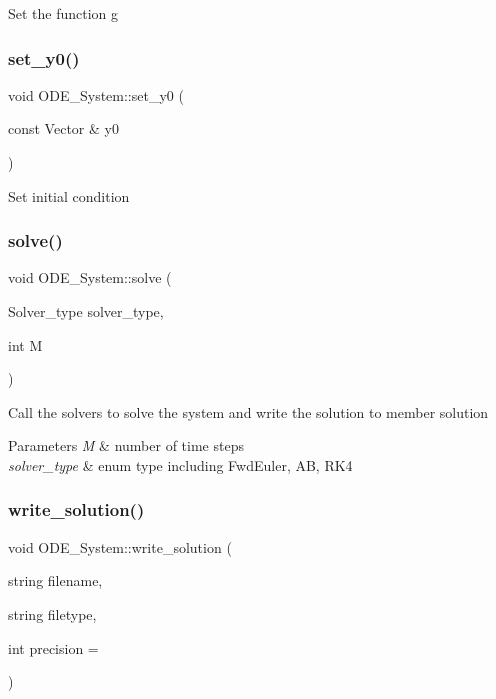 Set the function g \mbox{\label{class_o_d_e___system_a1856c9b15a41ca733e509e44f4535f5f}} 
\subsubsection{\texorpdfstring{set\+\_\+y0()}{set\_y0()}}
{\footnotesize\ttfamily void O\+D\+E\+\_\+\+System\+::set\+\_\+y0 (\begin{DoxyParamCaption}\item[{const Vector \&}]{y0 }\end{DoxyParamCaption})}

Set initial condition \mbox{\label{class_o_d_e___system_acb3bf3f43339cad39b4d0a5918dcf0eb}} 
\subsubsection{\texorpdfstring{solve()}{solve()}}
{\footnotesize\ttfamily void O\+D\+E\+\_\+\+System\+::solve (\begin{DoxyParamCaption}\item[{Solver\+\_\+type}]{solver\+\_\+type,  }\item[{int}]{M }\end{DoxyParamCaption})}

Call the solvers to solve the system and write the solution to member solution~\newline

\begin{DoxyParams}{Parameters}
{\em M} & number of time steps \\
\hline
{\em solver\+\_\+type} & enum type including Fwd\+Euler, AB, R\+K4 \\
\hline
\end{DoxyParams}
\mbox{\label{class_o_d_e___system_a5220baf5d3f6df54b78bb1ef5079e170}} 
\subsubsection{\texorpdfstring{write\+\_\+solution()}{write\_solution()}}
{\footnotesize\ttfamily void O\+D\+E\+\_\+\+System\+::write\+\_\+solution (\begin{DoxyParamCaption}\item[{string}]{filename,  }\item[{string}]{filetype,  }\item[{int}]{precision = {} }\end{DoxyParamCaption})}

